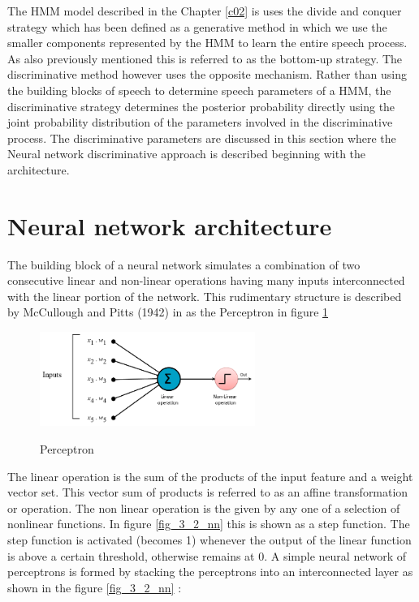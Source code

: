 The HMM model described in the Chapter \ref{c02} is uses the divide and conquer strategy which has been defined as a generative method in which we use the smaller components represented by the HMM to learn the entire speech process.   As also previously mentioned this is referred to as the bottom-up strategy.  The discriminative method however uses the opposite mechanism.  Rather than using the building blocks of speech to determine speech parameters of a HMM, the discriminative strategy determines the posterior probability directly using the joint probability distribution of the parameters involved in the discriminative process.  The discriminative parameters are discussed in this section where the Neural network discriminative approach is described beginning with the architecture.

\section{Neural network architecture}

The building block of a neural network simulates a combination of two consecutive linear and non-linear operations having many inputs interconnected with the linear portion of the network.  This rudimentary structure is described by McCullough and Pitts (1942) in  \cite{cowan1990discussion} as the Perceptron in figure \ref{fig_3_1_ptron} 

\begin{figure}
\centering
  \includegraphics[width=7cm]{thesis/images/ptron2.png}\\
  \caption{Perceptron} \label{fig_3_1_ptron}
\end{figure}

The linear operation is the sum of the products of the input feature and a  weight vector set.  This vector sum of products is referred to as an affine transformation or operation.  The non linear operation is the given by any one of a selection of nonlinear functions.  In  figure \ref{fig_3_2_nn} this is shown as a step function.  The step function is activated (becomes 1) whenever the output of the linear function is above a certain threshold, otherwise remains at 0.  A simple neural network of perceptrons is formed by stacking the perceptrons into an interconnected layer as shown in the figure \ref{fig_3_2_nn}  :

